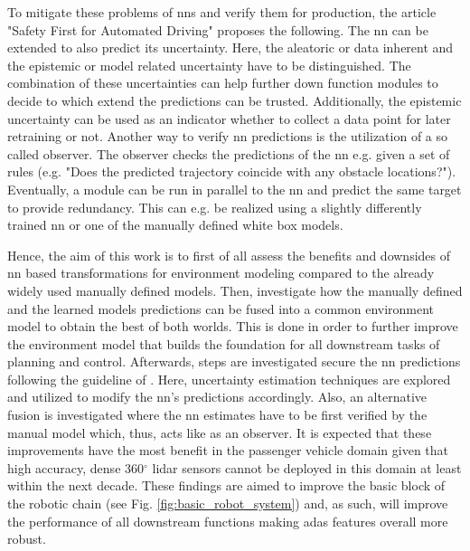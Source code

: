 To mitigate these problems of \gls{nn}s and verify them for production, the article "Safety First for Automated Driving" \cite{safetyfirst2019} proposes the following. The \gls{nn} can be extended to also predict its uncertainty. Here, the aleatoric or data inherent and the epistemic or model related uncertainty have to be distinguished. The combination of these uncertainties can help further down function modules to decide to which extend the predictions can be trusted. Additionally, the epistemic uncertainty can be used as an indicator whether to collect a data point for later retraining or not. Another way to verify \gls{nn} predictions is the utilization of a so called observer. The observer checks the predictions of the \gls{nn} e.g. given a set of rules (e.g. "Does the predicted trajectory coincide with any obstacle locations?"). Eventually, a module can be run in parallel to the \gls{nn} and predict the same target to provide redundancy. This can e.g. be realized using a slightly differently trained \gls{nn} or one of the manually defined white box models.

Hence, the aim of this work is to first of all assess the benefits and downsides of \gls{nn} based transformations for environment modeling compared to the already widely used manually defined models. Then, investigate how the manually defined and the learned models predictions can be fused into a common environment model to obtain the best of both worlds. This is done in order to further improve the environment model that builds the foundation for all downstream tasks of planning and control. Afterwards, steps are investigated secure the \gls{nn} predictions following the guideline of \cite{safetyfirst2019}. Here, uncertainty estimation techniques are explored and utilized to modify the \gls{nn}'s predictions accordingly.  Also, an alternative fusion is investigated where the \gls{nn} estimates have to be first verified by the manual model which, thus, acts like as an observer. It is expected that these improvements have the most benefit in the passenger vehicle domain given that high accuracy, dense 360$^{\circ}$ lidar sensors cannot be deployed in this domain at least within the next decade. These findings are aimed to improve the basic block of the robotic chain (see Fig. \ref{fig:basic_robot_system}) and, as such, will improve the performance of all downstream functions making \gls{adas} features overall more robust.